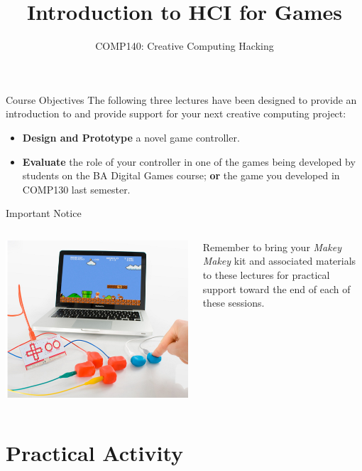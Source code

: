 \documentclass[xcolor={dvipsnames}]{beamer}\usepackage{etoolbox}\newtoggle{printable}\togglefalse{printable}
\begin{document}
\title{Introduction to HCI for Games}   
\subtitle{COMP140: Creative Computing Hacking}

\frame{\titlepage} 

\begin{frame}{Course Objectives}
	The following three lectures have been designed to provide an introduction to and provide support for your next creative computing project:
	
	\begin{itemize}
		\item \textbf{Design and Prototype} a novel game controller.
		\item \textbf{Evaluate} the role of your controller in one of the games being developed by students on the BA Digital Games course; \textbf{or}
                      the game you developed in COMP130 last semester.
	\end{itemize}
\end{frame}

\begin{frame}{Important Notice}
	\begin{columns}[onlytextwidth]
		\begin{column}{0.45\textwidth}
			\includegraphics[height=22ex]{MakeyMakey.jpg}
		\end{column}
		\begin{column}{0.45\textwidth}
			Remember to bring your \textit{Makey Makey} kit and associated materials to these lectures for practical 
			support toward the end of each of these sessions.
		\end{column}
	\end{columns}
\end{frame}



%

%

%

\part{Practical Activity}
\frame{\partpage}
\end{document}
